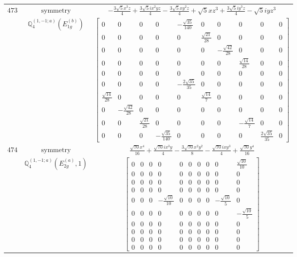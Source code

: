\documentclass[fleqn,8pt,landscape]{jsarticle}
\begin{document}
\begin{longtable}{ccc}
$ 473 $ & $ \text{symmetry} $ & $ - \frac{3 \sqrt{5} x^{3} z}{4} + \frac{3 \sqrt{5} i x^{2} y z}{4} - \frac{3 \sqrt{5} x y^{2} z}{4} + \sqrt{5} x z^{3} + \frac{3 \sqrt{5} i y^{3} z}{4} - \sqrt{5} i y z^{3} $ \\
$  $ & $ \mathbb{Q}_{4}^{(1,-1;a)}(E_{1g}^{(b)}) $ & $ \begin{bmatrix} 0 & 0 & 0 & 0 & - \frac{\sqrt{35}}{140} & 0 & 0 & 0 & 0 & 0 \\ 0 & 0 & 0 & 0 & 0 & \frac{\sqrt{21}}{28} & 0 & 0 & 0 & 0 \\ 0 & 0 & 0 & 0 & 0 & 0 & - \frac{\sqrt{42}}{28} & 0 & 0 & 0 \\ 0 & 0 & 0 & 0 & 0 & 0 & 0 & \frac{\sqrt{14}}{28} & 0 & 0 \\ 0 & 0 & 0 & 0 & 0 & 0 & 0 & 0 & 0 & 0 \\ 0 & 0 & 0 & 0 & - \frac{2 \sqrt{35}}{35} & 0 & 0 & 0 & 0 & 0 \\ \frac{\sqrt{14}}{28} & 0 & 0 & 0 & 0 & \frac{\sqrt{14}}{7} & 0 & 0 & 0 & 0 \\ 0 & - \frac{\sqrt{42}}{28} & 0 & 0 & 0 & 0 & 0 & 0 & 0 & 0 \\ 0 & 0 & \frac{\sqrt{21}}{28} & 0 & 0 & 0 & 0 & - \frac{\sqrt{14}}{7} & 0 & 0 \\ 0 & 0 & 0 & - \frac{\sqrt{35}}{140} & 0 & 0 & 0 & 0 & \frac{2 \sqrt{35}}{35} & 0 \end{bmatrix} $ \\ \hline
$ 474 $ & $ \text{symmetry} $ & $ \frac{\sqrt{70} x^{4}}{16} + \frac{\sqrt{70} i x^{3} y}{4} - \frac{3 \sqrt{70} x^{2} y^{2}}{8} - \frac{\sqrt{70} i x y^{3}}{4} + \frac{\sqrt{70} y^{4}}{16} $ \\
$  $ & $ \mathbb{Q}_{4}^{(1,-1;a)}(E_{2g}^{(a)},1) $ & $ \begin{bmatrix} 0 & 0 & 0 & 0 & 0 & 0 & 0 & 0 & 0 & \frac{\sqrt{10}}{10} \\ 0 & 0 & 0 & 0 & 0 & 0 & 0 & 0 & 0 & 0 \\ 0 & 0 & 0 & 0 & 0 & 0 & 0 & 0 & 0 & 0 \\ 0 & 0 & 0 & 0 & 0 & 0 & 0 & 0 & 0 & 0 \\ 0 & 0 & 0 & - \frac{\sqrt{10}}{10} & 0 & 0 & 0 & 0 & - \frac{\sqrt{10}}{5} & 0 \\ 0 & 0 & 0 & 0 & 0 & 0 & 0 & 0 & 0 & - \frac{\sqrt{10}}{5} \\ 0 & 0 & 0 & 0 & 0 & 0 & 0 & 0 & 0 & 0 \\ 0 & 0 & 0 & 0 & 0 & 0 & 0 & 0 & 0 & 0 \\ 0 & 0 & 0 & 0 & 0 & 0 & 0 & 0 & 0 & 0 \\ 0 & 0 & 0 & 0 & 0 & 0 & 0 & 0 & 0 & 0 \end{bmatrix} $ \\ \hline

\end{longtable}
\end{document}
